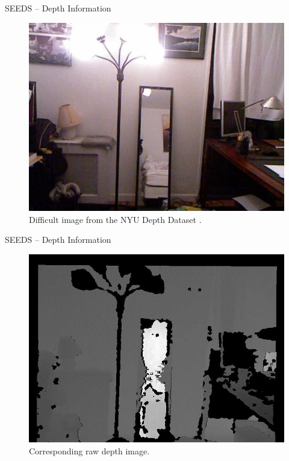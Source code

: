 \documentclass[handout]{beamer}
\begin{document}
	\begin{frame}{SEEDS -- Depth Information}
		\begin{figure}
   			\centering
   			\includegraphics[scale=0.33]{images/nyu-difficult}
   			\caption{Difficult image from the NYU Depth Dataset \cite{SilbermanHoiemKohliFergus:2012}.}
   		\end{figure}
	\end{frame}
	
	\begin{frame}{SEEDS -- Depth Information}
		\begin{figure}
   			\centering
   			\includegraphics[scale=0.439]{images/nyu-difficult-raw-depth}
   			\caption{Corresponding raw depth image.}
   		\end{figure}
	\end{frame}
	
\end{document}
